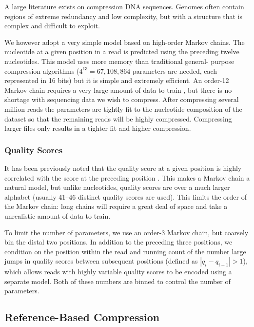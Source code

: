 \documentclass[twocolumn]{article}
\begin{document}
A large literature exists on compression DNA sequences. Genomes 
often contain regions of extreme redundancy and low complexity, but
with a structure that is complex and difficult to exploit.

We however adopt a very simple model based on high-order Markov chains. The
nucleotide at a given position in a read is predicted using the preceding
twelve nucleotides. This model uses more memory than traditional general-
purpose compression algorithms ($4^{13} = 67,108,864$ parameters are needed,
each represented in 16 bits)  but it is simple and extremely efficient. An
order-12 Markov chain requires a very large amount of data to train , but
there is no shortage with sequencing data we wish to compress. After
compressing several million reads the parameters are tightly fit to the
nucleotide composition of the dataset so that the remaining reads will be
highly compressed. Compressing larger files only results in a tighter fit and
higher compression.


\subsubsection{Quality Scores}

It has been previously noted that the quality score at a given position is
highly correlated with the score at the preceding position
\citep{Kozanitis2011}. This makes a Markov chain a natural model, but unlike
nucleotides, quality scores are over a much larger alphabet (usually 41--46
distinct quality scores are used). This limits the order of the Markov chain:
long chains will require a great deal of space and take a unrealistic amount
of data to train.

To limit the number of parameters, we use an order-3 Markov chain, but
coarsely bin the distal two positions. In addition to the preceding three
positions, we condition on the position within the read and running count of
the number large jumps in quality scores between subsequent positions (defined
as $|q_{i} - q_{i-1}| > 1$), which allows reads with highly variable quality
scores to be encoded using a separate model. Both of these numbers are binned
to control the number of parameters.


\subsection{Reference-Based Compression}
\end{document}
